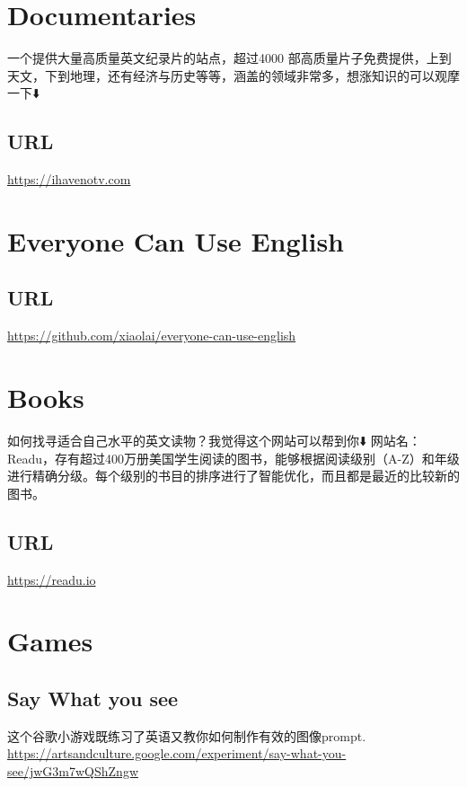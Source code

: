 \documentclass[11pt]{article}
\date{\today}
\title{}
\begin{document}
\tableofcontents

\section{Documentaries}
\label{sec:org9153ea3}
一个提供大量高质量英文纪录片的站点，超过4000 部高质量片子免费提供，上到天文，下到地理，还有经济与历史等等，涵盖的领域非常多，想涨知识的可以观摩一下⬇️
\subsection{URL}
\label{sec:orgfe931cc}
\url{https://ihavenotv.com}

\section{Everyone Can Use English}
\label{sec:orgf640553}
\subsection{URL}
\label{sec:orge1e3716}
\url{https://github.com/xiaolai/everyone-can-use-english}
\section{Books}
\label{sec:org75e3758}
如何找寻适合自己水平的英文读物？我觉得这个网站可以帮到你⬇️
网站名：Readu，存有超过400万册美国学生阅读的图书，能够根据阅读级别（A-Z）和年级进行精确分级。每个级别的书目的排序进行了智能优化，而且都是最近的比较新的图书。
\subsection{URL}
\label{sec:orgace05cb}
\url{https://readu.io}
\section{Games}
\label{sec:org7afbf90}
\subsection{Say What you see}
\label{sec:orgf0ccf3a}
这个谷歌小游戏既练习了英语又教你如何制作有效的图像prompt. \\
\url{https://artsandculture.google.com/experiment/say-what-you-see/jwG3m7wQShZngw}
\end{document}
